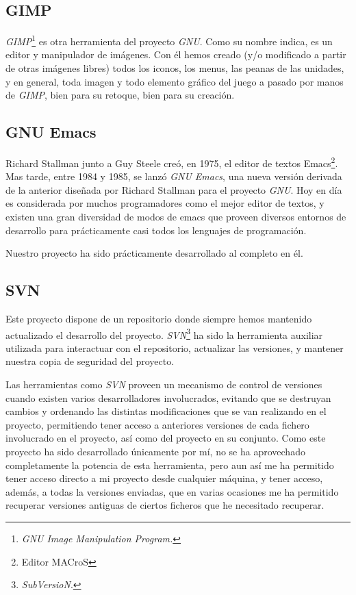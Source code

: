 \subsection{GIMP}
\emph{GIMP}\footnote{\emph{GNU Image Manipulation Program.}} es otra
herramienta del proyecto \emph{GNU}. Como su nombre indica, es un
editor y manipulador de imágenes. Con él hemos creado (y/o modificado
a partir de otras imágenes libres) todos los iconos, los menus, las
peanas de las unidades, y en general, toda imagen y todo elemento
gráfico del juego a pasado por manos de \emph{GIMP}, bien para su
retoque, bien para su creación.

\subsection{GNU Emacs}
Richard Stallman junto a Guy Steele creó, en 1975,
el editor de textos Emacs\footnote{Editor MACroS}. Mas tarde, entre
1984 y 1985, se lanzó \emph{GNU Emacs}, una nueva versión derivada de
la anterior diseñada por Richard Stallman para el proyecto
\emph{GNU}. Hoy en día es considerada por muchos programadores como el
mejor editor de textos, y existen una gran diversidad de modos de
emacs que proveen diversos entornos de desarrollo para prácticamente
casi todos los lenguajes de programación.

Nuestro proyecto ha sido prácticamente desarrollado al completo en él.

\subsection{SVN}
Este proyecto dispone de un repositorio donde siempre hemos mantenido
actualizado el desarrollo del proyecto. \emph{SVN}\footnote{\emph{SubVersioN}.} ha sido la
herramienta auxiliar utilizada para interactuar con el repositorio,
actualizar las versiones, y mantener nuestra copia de seguridad del proyecto.

Las herramientas como \emph{SVN} proveen un mecanismo de control de
versiones cuando existen varios desarrolladores involucrados, evitando
que se destruyan cambios y ordenando las distintas modificaciones que
se van realizando en el proyecto, permitiendo tener acceso a
anteriores versiones de cada fichero involucrado en el proyecto, así
como del proyecto en su conjunto. Como este proyecto ha
sido desarrollado únicamente por mí, no se ha aprovechado
completamente la potencia de esta herramienta, pero aun así me ha
permitido tener acceso directo a mi proyecto desde cualquier máquina,
y tener acceso, además, a todas la versiones enviadas, que en varias
ocasiones me ha permitido recuperar versiones antiguas de ciertos
ficheros que he necesitado recuperar.

